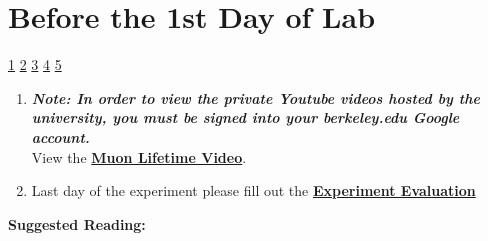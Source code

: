 \documentclass{../lab}
\begin{document}
\newpage

\section{Before the 1st Day of Lab}

\signatures \hyperlink{Apparatus in the other room}{ 1} \hyperlink{Oscilloscope (MSO-2024)}{ 2} \hyperlink{Trigger Rate}{ 3} \hyperlink{Initial Test Run}{ 4} \hyperlink{Time Difference Data}{ 5}

\begin{enumerate}
    \item \emph{\textbf{Note: In order to view the private Youtube videos hosted by the university, you must be signed into your berkeley.edu Google account.}} \\
    View the \href{http://youtu.be/uqH0qRIwBmg}{\textbf{Muon Lifetime Video}}.

    \item Last day of the experiment please fill out the \href{\ExperimentEvaluation}{\textbf{Experiment Evaluation}}

\end{enumerate}

\noindent\textbf{Suggested Reading:}
\end{document}
